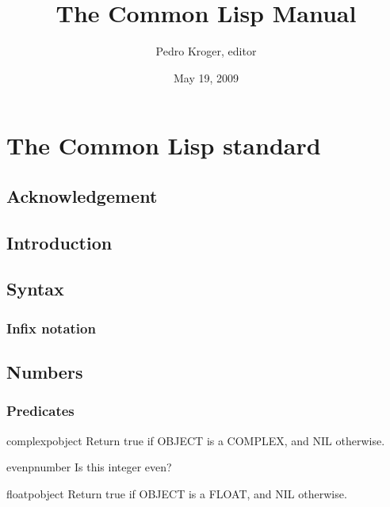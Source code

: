 \documentclass[10pt,english]{book}
\title{The Common Lisp Manual}
\author{Pedro Kroger, editor}
\date{May 19, 2009}
\begin{document}
\frontmatter

\maketitle
\tableofcontents

\mainmatter

\part{The Common Lisp standard}
\label{part:common-lisp-standard}


\chapter*{Acknowledgement}
\label{cha:acknowledgement}



\chapter{Introduction}



\chapter{Syntax}
\label{cha:syntax}

\section{Infix notation}
\label{sec:infix-notation}



\chapter{Numbers}

\section{Predicates}
\label{sec:number-predicates}

\begin{function}{complexp}{object}
  Return true if OBJECT is a COMPLEX, and NIL otherwise.
\end{function}

\begin{function}{evenp}{number}
  Is this integer even?
\end{function}

\begin{function}{floatp}{object}
  Return true if OBJECT is a FLOAT, and NIL otherwise.
\end{function}
\end{document}
